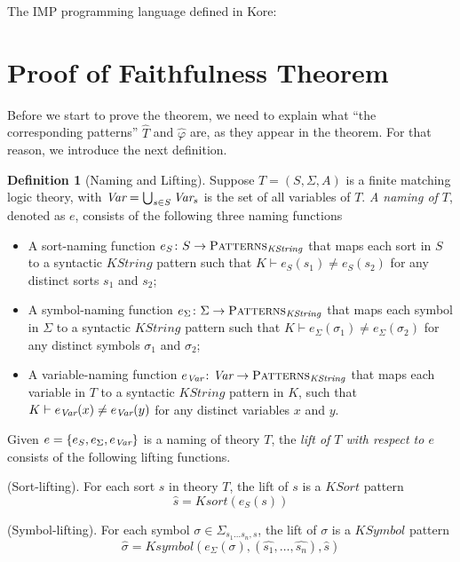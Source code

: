 \documentclass[UTF8,11pt]{article}
\newcounter{thmcounter}
\theoremstyle{plain}
\theoremstyle{definition}
\newtheorem{definition} [thmcounter]{Definition}
\theoremstyle{remark}
\newcommand{\PATTERNS}{\text{P\textsc{atterns}}}
\newcommand{\KString}{\mathit{KString}}
\newcommand{\KSort}{\mathit{KSort}}
\newcommand{\Ksort}{\mathit{Ksort}}
\newcommand{\KSymbol}{\mathit{KSymbol}}
\newcommand{\Ksymbol}{\mathit{Ksymbol}}
\begin{document}
The IMP programming language defined in Kore:


\section{Proof of Faithfulness Theorem}
Before we start to prove the theorem, we need to explain what ``the 
corresponding patterns'' $\hat{T}$ and $\hat{\varphi}$ are, as they appear in 
the theorem.
For that reason, we introduce the next definition.

\begin{definition}[Naming and Lifting]
	Suppose $T = (S, \Sigma, A)$ is a finite matching logic theory, with $\textit{Var} 
	= \bigcup_{s \in S} \textit{Var}_s$ is the set of all variables of $T$.
	\emph{A naming of $T$}, denoted as $e$, consists of the following three 
	naming functions
	\begin{itemize}
		\item A sort-naming function $e_S \colon S \to \PATTERNS_\KString$ that 
		maps each sort in $S$ to a syntactic $\KString$ pattern such that $K 
		\vdash e_S(s_1) \neq e_S(s_2)$ for any distinct sorts $s_1$ and $s_2$;
		\item A symbol-naming function $e_\Sigma \colon \Sigma \to 
		\PATTERNS_\KString$ that maps each symbol in $\Sigma$ to a syntactic 
		$\KString$ pattern such that $K \vdash e_\Sigma(\sigma_1) \neq 
		e_\Sigma(\sigma_2)$ for any distinct symbols $\sigma_1$ and $\sigma_2$;
		\item A variable-naming function $e_\Var \colon \Var \to 
		\PATTERNS_\KString$ that maps each variable in $T$ to a syntactic 
		$\KString$ pattern in $K$, such that $K \vdash e_{\textit{Var}}(x) \neq 
		e_{\textit{Var}}(y)$ for any distinct variables $x$ and $y$.
	\end{itemize}
	
	Given $e = \{e_S, e_\Sigma, e_{\textit{Var}} \}$ is a naming of theory $T$, the 
	\emph{lift of $T$ with respect to $e$} consists of the following lifting 
	functions.
	
	(Sort-lifting).
	For each sort $s$ in theory $T$, the lift of $s$ is a $\KSort$ pattern
	$$ \hat{s} = \Ksort(e_S(s))$$
	
	(Symbol-lifting).
	For each symbol $\sigma \in \Sigma_{s_1 \dots s_n, s}$, the lift of 
	$\sigma$ is a $\KSymbol$ pattern 
	$$ \hat{\sigma} = \Ksymbol(e_\Sigma(\sigma), (\hat{s_1}, \dots, \hat{s_n}), 
	\hat{s})$$
	

\end{definition}
\end{document}

